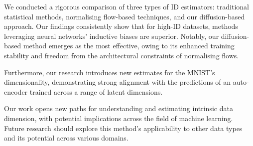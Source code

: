 We conducted a rigorous comparison of three types of ID estimators: traditional statistical methods, normalising flow-based techniques, and our diffusion-based approach. Our findings consistently show that for high-ID datasets, methods leveraging neural networks' inductive biases are superior. Notably, our diffusion-based method emerges as the most effective, owing to its enhanced training stability and freedom from the architectural constraints of normalising flows.

Furthermore, our research introduces new estimates for the MNIST's dimensionality, demonstrating strong alignment with the predictions of an auto-encoder trained across a range of latent dimensions.%

Our work opens new paths for understanding and estimating intrinsic data dimension, with potential implications across the field of machine learning. Future research should explore this method's applicability to other data types and its potential across various domains.

